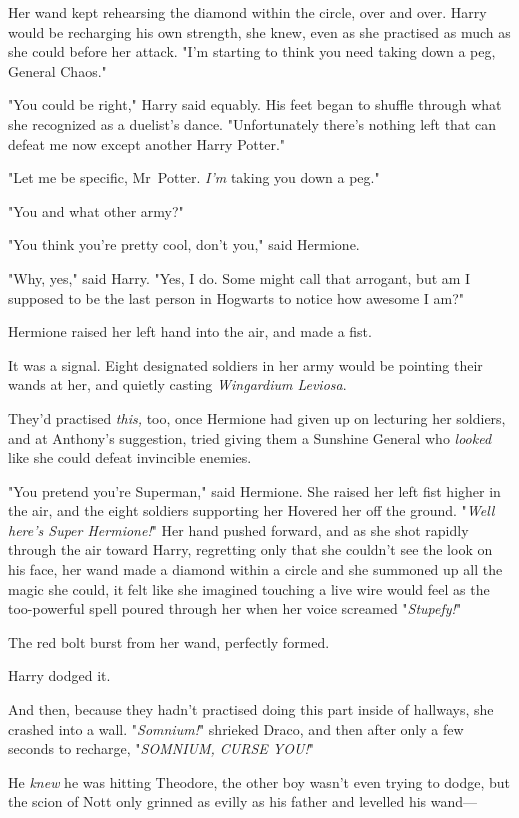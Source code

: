 Her wand kept rehearsing the diamond within the circle, over and over. Harry
would be recharging his own strength, she knew, even as she practised as much
as she could before her attack. "I'm starting to think you need taking down a
peg, General Chaos."

"You could be right," Harry said equably. His feet began to shuffle through
what she recognized as a duelist's dance. "Unfortunately there's nothing left
that can defeat me now except another Harry Potter."

"Let me be specific, Mr~Potter. \emph{I'm} taking you down a peg."

"You and what other army?"

"You think you're pretty cool, don't you," said Hermione.

"Why, yes," said Harry. "Yes, I do. Some might call that arrogant, but am I
supposed to be the last person in Hogwarts to notice how awesome I am?"

Hermione raised her left hand into the air, and made a fist.

It was a signal. Eight designated soldiers in her army would be pointing their
wands at her, and quietly casting \emph{Wingardium Leviosa}.

They'd practised \emph{this,} too, once Hermione had given up on lecturing her
soldiers, and at Anthony's suggestion, tried giving them a Sunshine General who
\emph{looked} like she could defeat invincible enemies.

"You pretend you're Superman," said Hermione. She raised her left fist higher
in the air, and the eight soldiers supporting her Hovered her off the ground.
"\emph{Well here's Super Hermione!}" Her hand pushed forward, and as she shot
rapidly through the air toward Harry, regretting only that she couldn't see the
look on his face, her wand made a diamond within a circle and she summoned up
all the magic she could, it felt like she imagined touching a live wire would
feel as the too-powerful spell poured through her when her voice screamed
"\emph{Stupefy!}"

The red bolt burst from her wand, perfectly formed.

Harry dodged it.

And then, because they hadn't practised doing this part inside of hallways, she
crashed into a wall.
\later
"\emph{Somnium!}" shrieked Draco, and then after only a few seconds to
recharge, "\emph{SOMNIUM, CURSE YOU!}"

He \emph{knew} he was hitting Theodore, the other boy wasn't even trying to
dodge, but the scion of Nott only grinned as evilly as his father and levelled
his wand—

